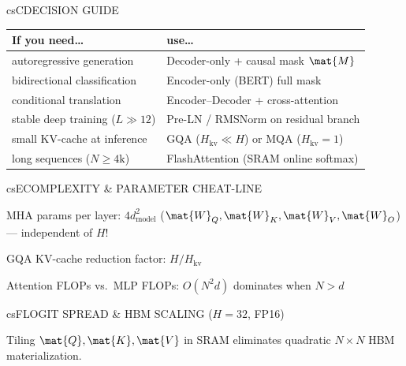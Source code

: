 \documentclass[../../../../master.tex]{subfiles}
\begin{document}
\begin{cscolumns}
\begin{cscard}{csC}{DECISION GUIDE}
  \renewcommand{\arraystretch}{1.22}\small
  \begin{tabular}{@{}>{\raggedright\arraybackslash}p{3.1cm}>{\raggedright\arraybackslash}p{4.6cm}@{}}
    \textbf{If you need\ldots} & \textbf{use\ldots}\\ \hline
    autoregressive generation & Decoder-only + causal mask $\mat{M}$\\
    bidirectional classification & Encoder-only (BERT) full mask\\
    conditional translation & Encoder--Decoder + cross-attention\\
    stable deep training ($L\gg 12$) & Pre-LN / RMSNorm on residual branch\\
    small KV-cache at inference & GQA ($H_{\mathrm{kv}} \ll H$) or MQA ($H_{\mathrm{kv}}=1$)\\
    long sequences ($N\ge 4\text{k}$) & FlashAttention (SRAM online softmax)\\
  \end{tabular}
\end{cscard}

\begin{cscard}{csE}{COMPLEXITY \& PARAMETER CHEAT-LINE}
  \begin{csbul}
    \item MHA params per layer: $4d_{\mathrm{model}}^2$ ($\mat{W}_Q,\mat{W}_K,\mat{W}_V,\mat{W}_O$) — independent of $H$!
    \item GQA KV-cache reduction factor: $H / H_{\mathrm{kv}}$
    \item Attention FLOPs vs.\ MLP FLOPs: $O(N^2 d)$ dominates when $N > d$
  \end{csbul}
\end{cscard}

\begin{cscard}{csF}{LOGIT SPREAD \& HBM SCALING ($H=32$, FP16)}
  \centering
  \par
  {\scriptsize Tiling $\mat{Q},\mat{K},\mat{V}$ in SRAM eliminates quadratic $N\times N$ HBM materialization.}
\end{cscard}
\columnbreak


\end{cscolumns}
\end{document}

